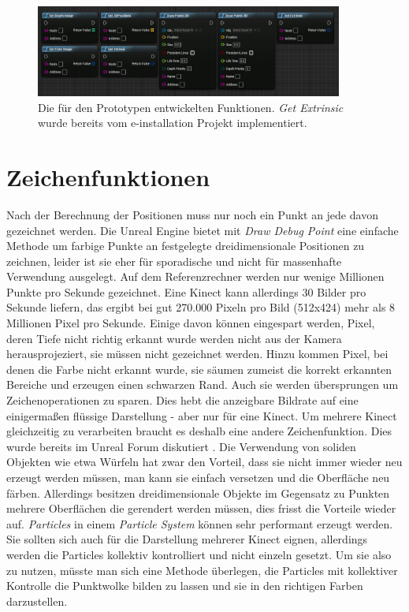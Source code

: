 \documentclass[a4paper]{IEEEtran}
\begin{document}
	\begin{figure}[t]
    	\centering
		\includegraphics[width=0.9\textwidth]{img/AllFunctionsBP}
	    \caption{Die für den Prototypen entwickelten Funktionen. {\textit{Get Extrinsic}} wurde bereits vom e-installation Projekt implementiert.}
    	\label{AllFunctionsBP}
	\end{figure}

\section{Zeichenfunktionen}
	Nach der Berechnung der Positionen muss nur noch ein Punkt an jede davon gezeichnet werden. 
	Die Unreal Engine bietet mit {\textit{Draw Debug Point}} eine einfache Methode um farbige Punkte an festgelegte dreidimensionale Positionen zu zeichnen, leider ist sie eher für sporadische und nicht für massenhafte Verwendung ausgelegt. 
	Auf dem Referenzrechner werden nur wenige Millionen Punkte pro Sekunde gezeichnet. 
	Eine Kinect kann allerdings 30 Bilder pro Sekunde liefern, das ergibt bei gut 270.000 Pixeln pro Bild (512x424) mehr als 8 Millionen Pixel pro Sekunde. 
	Einige davon können eingespart werden, Pixel, deren Tiefe nicht richtig erkannt wurde werden nicht aus der Kamera herausprojeziert, sie müssen nicht gezeichnet werden. 
	Hinzu kommen Pixel, bei denen die Farbe nicht erkannt wurde, sie säumen zumeist die korrekt erkannten Bereiche und erzeugen einen schwarzen Rand. 
	Auch sie werden übersprungen um Zeichenoperationen zu sparen. 
	Dies hebt die anzeigbare Bildrate auf eine einigermaßen flüssige Darstellung - aber nur für eine Kinect. 
	Um mehrere Kinect gleichzeitig zu verarbeiten braucht es deshalb eine andere Zeichenfunktion.
	Dies wurde bereits im Unreal Forum diskutiert {\cite{lidar}}.
	Die Verwendung von soliden Objekten wie etwa Würfeln hat zwar den Vorteil, dass sie nicht immer wieder neu erzeugt werden müssen, man kann sie einfach versetzen und die Oberfläche neu färben. 
	Allerdings besitzen dreidimensionale Objekte im Gegensatz zu Punkten mehrere Oberflächen die gerendert werden müssen, dies frisst die Vorteile wieder auf.
	{\textit{Particles}} in einem {\textit{Particle System}} können sehr performant erzeugt werden. 
	Sie sollten sich auch für die Darstellung mehrerer Kinect eignen, allerdings werden die Particles kollektiv kontrolliert und nicht einzeln gesetzt. 
	Um sie also zu nutzen, müsste man sich eine Methode überlegen, die Particles mit kollektiver Kontrolle die Punktwolke bilden zu lassen und sie in den richtigen Farben darzustellen. \\[0.5cm]
	
\end{document}
